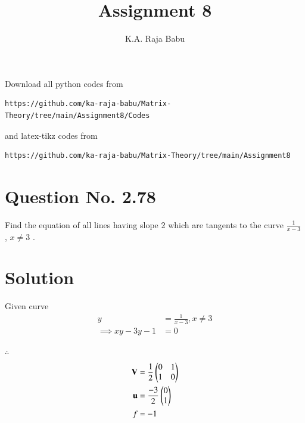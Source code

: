 \documentclass[journal,12pt,twocolumn]{IEEEtran}
\begin{document}
     \def\rightbox#1{\makebox[0in][r]{#1}}
     \def\centbox#1{\makebox[0in]{#1}}
     \def\topbox#1{\raisebox{-\baselineskip}[0in][0in]{#1}}
     \def\midbox#1{\raisebox{-0.5\baselineskip}[0in][0in]{#1}}
\vspace{3cm}
\title{Assignment 8}
\author{K.A. Raja Babu}
\maketitle
\newpage
\bigskip
\renewcommand{\thefigure}{\theenumi}
\renewcommand{\thetable}{\theenumi}
Download all python codes from 
\begin{lstlisting}
https://github.com/ka-raja-babu/Matrix-Theory/tree/main/Assignment8/Codes
\end{lstlisting}
%
and latex-tikz codes from 
%
\begin{lstlisting}
https://github.com/ka-raja-babu/Matrix-Theory/tree/main/Assignment8
\end{lstlisting}
%
\section{Question No. 2.78}
Find the equation of all lines having slope 2 which are tangents to the curve $\frac{1}{x-3}$ , $x \neq 3$ .
%
\section{Solution}
Given curve  
\begin{align}
    y &= \frac{1}{x-3} , x \neq 3 \label{giveneq}
    \\
    \implies xy - 3y - 1 &= 0
\end{align}

$\therefore$
\begin{align}
    \mathbf{V} &= \frac{1}{2}\begin{pmatrix}0 & 1 \\ 1 & 0\end{pmatrix}
    \\
    \mathbf{u} &= \frac{-3}{2}\begin{pmatrix}0 \\ 1\end{pmatrix}
    \\
    f &= -1
\end{align}
\end{document}
